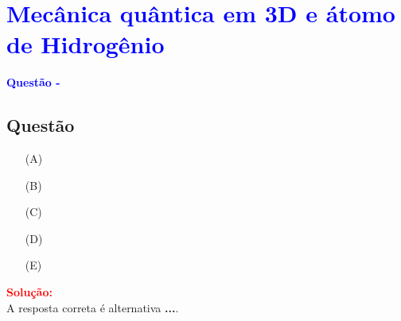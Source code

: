 \section{\large \textcolor{blue}{Mecânica quântica em 3D e átomo de Hidrogênio}}

\begin{flushleft}
\textbf{\textcolor{blue}{\Large Quest\~ao - }}\\
\noindent

\subsection{Quest\~ao }

\begin{itemize}
\item[(A)] 
\item[(B)] 
\item[(C)]
\item[(D)] 
\item[(E)] 
\end{itemize}

\vspace{0.5cm}

\textcolor{red}{\textbf{Solução:}}\\


A resposta correta é alternativa \colorbox{green!50}{\textbf{...}}.

\end{flushleft}